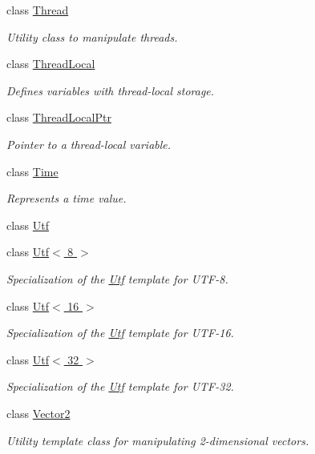 \begin{DoxyCompactItemize}
class \hyperlink{classsf_1_1_thread}{Thread}
\begin{DoxyCompactList}\small\item\em Utility class to manipulate threads. \end{DoxyCompactList}\item 
class \hyperlink{classsf_1_1_thread_local}{Thread\-Local}
\begin{DoxyCompactList}\small\item\em Defines variables with thread-\/local storage. \end{DoxyCompactList}\item 
class \hyperlink{classsf_1_1_thread_local_ptr}{Thread\-Local\-Ptr}
\begin{DoxyCompactList}\small\item\em Pointer to a thread-\/local variable. \end{DoxyCompactList}\item 
class \hyperlink{classsf_1_1_time}{Time}
\begin{DoxyCompactList}\small\item\em Represents a time value. \end{DoxyCompactList}\item 
class \hyperlink{classsf_1_1_utf}{Utf}
\item 
class \hyperlink{classsf_1_1_utf_3_018_01_4}{Utf$<$ 8 $>$}
\begin{DoxyCompactList}\small\item\em Specialization of the \hyperlink{classsf_1_1_utf}{Utf} template for U\-T\-F-\/8. \end{DoxyCompactList}\item 
class \hyperlink{classsf_1_1_utf_3_0116_01_4}{Utf$<$ 16 $>$}
\begin{DoxyCompactList}\small\item\em Specialization of the \hyperlink{classsf_1_1_utf}{Utf} template for U\-T\-F-\/16. \end{DoxyCompactList}\item 
class \hyperlink{classsf_1_1_utf_3_0132_01_4}{Utf$<$ 32 $>$}
\begin{DoxyCompactList}\small\item\em Specialization of the \hyperlink{classsf_1_1_utf}{Utf} template for U\-T\-F-\/32. \end{DoxyCompactList}\item 
class \hyperlink{classsf_1_1_vector2}{Vector2}
\begin{DoxyCompactList}\small\item\em Utility template class for manipulating 2-\/dimensional vectors. \end{DoxyCompactList}\item 

\end{DoxyCompactItemize}
